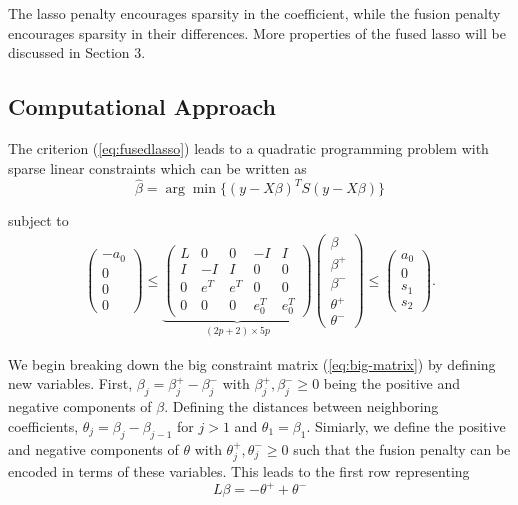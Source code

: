 \documentclass[12pt]{article}
\begin{document}
\noindent The lasso penalty encourages sparsity in the coefficient, while the fusion penalty encourages sparsity in their differences. More properties of the fused lasso will be discussed in Section 3.

\subsection{Computational Approach}

The criterion (\ref{eq:fusedlasso}) leads to a quadratic programming problem with sparse linear constraints which can be written as
\[\hat{\beta} = \arg\min \{(y - X\beta)^T S (y - X\beta)\}\]

\noindent subject to
\begin{align}
    \begin{pmatrix}
    -a_0 \\ 0 \\ 0 \\ 0
\end{pmatrix}
\leq
\underbrace{
\begin{pmatrix}
    L & 0 & 0 & -I & I \\
    I & -I & I & 0 & 0 \\
    0 & e^T & e^T & 0 & 0 \\
    0 & 0 & 0 & e_0^T & e_0^T
\end{pmatrix}
}_{(2p + 2) \times 5p}
\begin{pmatrix}
    \beta \\ \beta^+ \\ \beta^- \\ \theta^+ \\ \theta^-
\end{pmatrix}
\leq
\begin{pmatrix}
    a_0 \\ 0 \\ s_1 \\ s_2
\end{pmatrix}.
\label{eq:big-matrix}
\end{align}

\noindent We begin breaking down the big constraint matrix (\ref{eq:big-matrix}) by defining new variables. First, $\beta_j = \beta_j^+ - \beta_j^-$ with $\beta_j^+, \beta_j^- \ge 0$ being the positive and negative components of $\beta$. Defining the distances between neighboring coefficients, $\theta_j = \beta_j - \beta_{j - 1}$ for $j > 1$ and $\theta_1 = \beta_1$. Simiarly, we define the positive and negative components of $\theta$ with $\theta_j^+, \theta_j^- \ge 0$ such that the fusion penalty can be encoded in terms of these variables. This leads to the first row representing
\[L\beta = -\theta^+ + \theta^-\]
\end{document}
